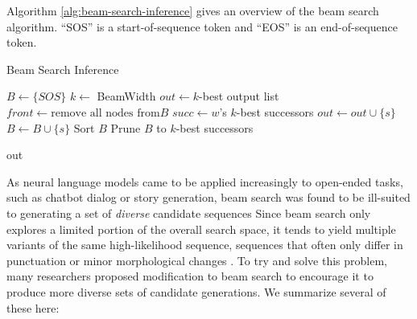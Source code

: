 Algorithm \ref{alg:beam-search-inference} gives an overview of the beam search algorithm. 
``SOS'' is a start-of-sequence token and ``EOS'' is an end-of-sequence token.

\begin{algorithm}
\caption{Beam Search Inference}
\label{alg:beam-search-inference}

\begin{algorithmic}[1]
\State $B \gets \{SOS\}$
\State $k \gets $ BeamWidth
\State $out \gets k$-best output list
    \State $front \gets \text{remove all nodes from} B$
    \State $succ \gets w$'s $k$-best successors
        \State $out \gets out \cup \{s\}$
    \Else
        \State $B \gets B \cup \{s\}$
    \EndIf
    \EndFor
    \EndFor
    \State Sort $B$
        \State Prune $B$ to $k$-best successors
    \EndIf
\EndWhile

\Return out
\EndProcedure
\end{algorithmic}
\end{algorithm}

As neural language models came to be applied increasingly to open-ended tasks, such as chatbot dialog or story generation, beam search was found to be ill-suited to generating a set of \textit{diverse} candidate sequences
Since beam search only explores a limited portion of the overall search space, it tends to yield multiple variants of the same high-likelihood sequence, sequences that often only differ in punctuation or minor morphological changes \cite{li2016mutual}.  
To try and solve this problem, many researchers proposed modification to beam search to encourage it to produce more diverse sets of candidate generations.
We summarize several of these here:

